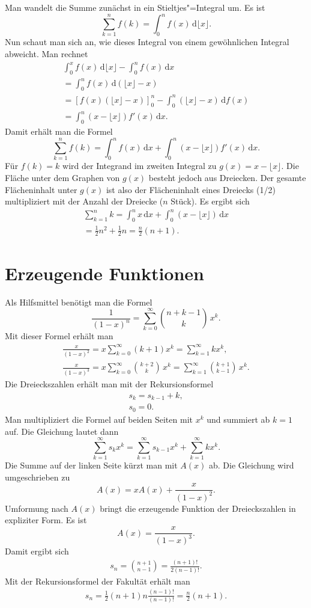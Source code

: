 \documentclass[a4paper,11pt,fleqn,twocolumn,twoside]{scrartcl}
\begin{document}
Man wandelt die Summe zunächst in ein Stieltjes"=Integral um. Es ist
\[\sum_{k=1}^n f(k) = \int_0^n f(x)\,\mathrm d\lfloor x\rfloor.\]
Nun schaut man sich an, wie dieses Integral von einem gewöhnlichen
Integral abweicht. Man rechnet%
\begin{gather*}
\int_0^x f(x)\,\mathrm d\lfloor x\rfloor - \int_0^n f(x)\,\mathrm dx\\
= \int_0^n f(x)\,\mathrm d(\lfloor x\rfloor-x)\\
= [f(x)(\lfloor x\rfloor-x)]_0^n
- \int_0^n (\lfloor x\rfloor -x)\,\mathrm df(x)\\
= \int_0^n (x-\lfloor x\rfloor)f'(x)\,\mathrm dx.
\end{gather*}
Damit erhält man die Formel
\[\sum_{k=1}^n f(k) = \int_0^n f(x)\,\mathrm dx
+\int_0^n (x-\lfloor x\rfloor)f'(x)\,\mathrm dx.\]
Für $f(k)=k$ wird der Integrand im zweiten Integral zu
$g(x)=x-\lfloor x\rfloor$. Die Fläche unter dem Graphen von $g(x)$
besteht jedoch aus Dreiecken. Der gesamte Flächeninhalt unter $g(x)$
ist also der Flächeninhalt eines Dreiecks (1/2) multipliziert
mit der Anzahl der Dreiecke ($n$ Stück). Es ergibt sich%
\begin{gather*}
\sum_{k=1}^n k = \int_0^n x\,\mathrm dx
+\int_0^n (x-\lfloor x\rfloor)\,\mathrm dx\\
= \frac{1}{2}n^2 + \frac{1}{2}n = \frac{n}{2}(n+1).
\end{gather*}

\section{Erzeugende Funktionen}

Als Hilfsmittel benötigt man die Formel%
\[\frac{1}{(1-x)^n} = \sum_{k=0}^{\infty} \binom{n+k-1}{k}\,x^k.\]
Mit dieser Formel erhält man
\begin{gather*}
\frac{x}{(1-x)^2} = x\sum_{k=0}^{\infty} (k+1)x^k
= \sum_{k=1}^{\infty} kx^k,\\
\frac{x}{(1-x)^3} = x\sum_{k=0}^{\infty} \binom{k+2}{k}\,x^k
= \sum_{k=1}^{\infty} \binom{k+1}{k-1}\,x^k.
\end{gather*}
Die Dreieckszahlen erhält man mit der Rekursionsformel%
\begin{gather*}
s_k=s_{k-1}+k,\\
s_0=0.
\end{gather*}
Man multipliziert die Formel auf beiden Seiten mit $x^k$
und summiert ab $k=1$ auf. Die Gleichung lautet dann%
\[\sum_{k=1}^{\infty} s_k x^k
= \sum_{k=1}^{\infty} s_{k-1}x^k + \sum_{k=1}^{\infty} kx^k.\]
Die Summe auf der linken Seite kürzt man mit $A(x)$ ab.
Die Gleichung wird umgeschrieben zu%
\[A(x) = xA(x) + \frac{x}{(1-x)^2}.\]
Umformung nach $A(x)$ bringt die erzeugende Funktion der
Dreieckszahlen in expliziter Form. Es ist%
\[A(x) = \frac{x}{(1-x)^3}.\]
Damit ergibt sich
\begin{gather*}
s_n = \binom{n+1}{n-1} = \frac{(n+1)!}{2(n-1)!}.
\end{gather*}
Mit der Rekursionsformel der Fakultät erhält man%
\begin{gather*}
s_n = \frac{1}{2}(n+1)n\frac{(n-1)!}{(n-1)!}
= \frac{n}{2}(n+1).
\end{gather*}
\end{document}
